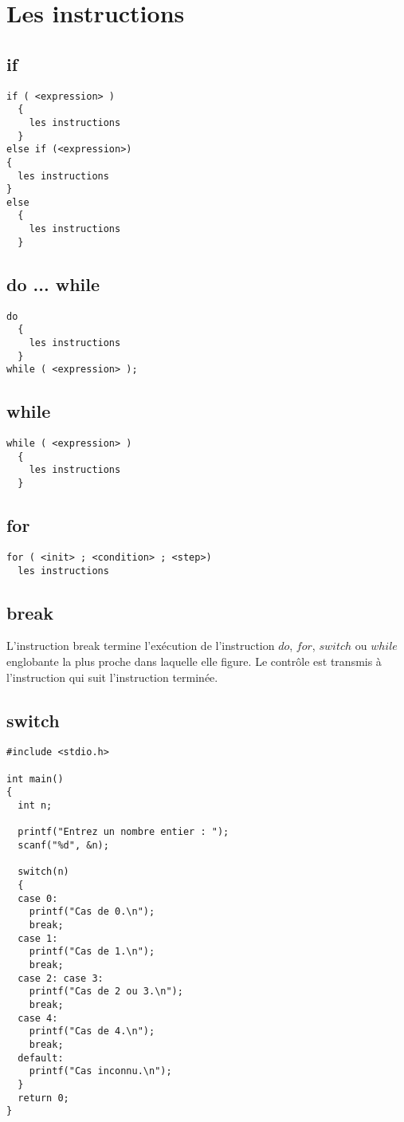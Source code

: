 \documentclass[a4paper]{article}
\begin{document}
\section{Les instructions}
\subsection{if}
\begin{lstlisting}
if ( <expression> )
  {
    les instructions
  }
else if (<expression>)
{
  les instructions
}
else
  {
    les instructions
  }
\end{lstlisting}
\subsection{do ... while}
\begin{lstlisting}
do
  {
    les instructions
  }
while ( <expression> );
\end{lstlisting}
\subsection{while}
\begin{lstlisting}
while ( <expression> )
  {
    les instructions
  }
\end{lstlisting}
\subsection{for}
\begin{lstlisting}
for ( <init> ; <condition> ; <step>)
  les instructions
\end{lstlisting}
\subsection{break}
L'instruction break termine l'exécution de l'instruction $do$, $for$, $switch$ ou $while$ englobante la plus proche dans laquelle elle figure. Le contrôle est transmis à l'instruction qui suit l'instruction terminée.\subsection{switch}
\begin{lstlisting}
#include <stdio.h>

int main()
{
  int n;

  printf("Entrez un nombre entier : ");
  scanf("%d", &n);

  switch(n)
  {
  case 0:
    printf("Cas de 0.\n");
    break;
  case 1:
    printf("Cas de 1.\n");
    break;
  case 2: case 3:
    printf("Cas de 2 ou 3.\n");
    break;
  case 4:
    printf("Cas de 4.\n");
    break;
  default:
    printf("Cas inconnu.\n");
  }
  return 0;
}
\end{lstlisting}
\end{document}
